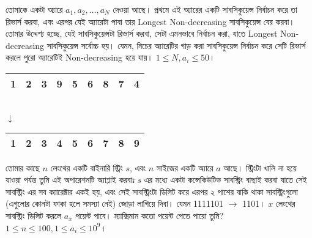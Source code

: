 \begin{example}[\href{http://www.usaco.org/index.php?page=viewproblem2%
  &cpid=698}{USACO - Subsequence Reversal}]
  তোমাকে একটা অ্যারে $a_1, a_2, \ldots, a_N$ দেওয়া আছে। প্রথমে এই অ্যারের
  একটি সাবসিকুয়েন্স নির্বাচন করে তা রিভার্স করবা, এবং এরপর যেই অ্যারেটা পাবা
  তার Longest Non-decreasing সাবসিকুয়েন্স বের করবা। তোমার উদ্দেশ্য হচ্ছে, যেই
  সাবসিকুয়েন্সটা রিভার্স করবা, সেটা এমনভাবে নির্বাচন করা, যাতে Longest
  Non-decreasing সাবসিকুয়েন্স সর্বোচ্চ হয়। যেমন, নিচের অ্যারেটির গাড় করা
  সাবসিকুয়েন্স নির্বাচন করে সেটি রিভার্স করলে পুরো অ্যারেটিই Non-decreasing
  হয়ে যায়। $1 \le N, a_i \le 50$।
  \begin{center}
    \begin{tabular}{|c|c|c|c|c|c|c|c|c|}
      \hline
      1 & 2 & 3 & \cellcolor{black!25}9 & 5 & 6 & \cellcolor{black!25}8 &
      \cellcolor{black!25}7 & \cellcolor{black!25}4 \\
      \hline
    \end{tabular}\\
    $\downarrow$\\
    \begin{tabular}{|c|c|c|c|c|c|c|c|c|}
      \hline
      1 & 2 & 3 & \cellcolor{black!25}4 & 5 & 6 & \cellcolor{black!25}7 &
      \cellcolor{black!25}8 & \cellcolor{black!25}9 \\
      \hline
    \end{tabular}
  \end{center}
\end{example}

\begin{example}
  তোমার কাছে $n$ লেংথের একটি বাইনারি স্ট্রিং $s$, এবং $n$ সাইজের একটি অ্যারে
  $a$ আছে। স্ট্রিংটা খালি না হয়ে যাওয়া পর্যন্ত তুমি এই অপারেশনটি অ্যাপ্লাই
  করবাঃ $s$ এর মধ্যে একটা কন্সেকিউটিভ সাবস্ট্রিং বাছাই করবা যাতে সেই
  সাবস্ট্রিং এর সব ক্যারেক্টার একই হয়, এবং সেই সাবস্ট্রিংটা ডিলিট করে এরপর ২
  পাশের বাকি থাকা সাবস্ট্রিংগুলো (এগুলোর কোনটা ফাকা হলে সমস্যা নেই) জোড়া
  লাগিয়ে দিবা। যেমন 1\colorbox{black!25}{111}101 $\rightarrow$ 1101। $x$
  লেংথের সাবস্ট্রিং ডিলিট করলে $a_x$ পয়েন্ট পাবে। ম্যাক্সিমাম কতো পয়েন্ট
  পেতে পারো তুমি? $1 \le n \le 100, 1 \le a_i \le 10^9$।
\end{example}

